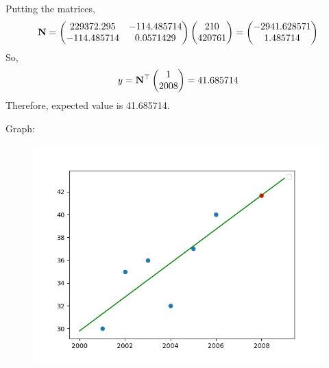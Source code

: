 \documentclass{beamer}
\numberwithin{equation}{section}
\begin{document}
		Putting the matrices,\begin{align}
				\mathbf{N}	= \begin{pmatrix}229372.295 & -114.485714 \\
-114.485714 & 0.0571429\end{pmatrix}\begin{pmatrix}210 \\ 420761\end{pmatrix} = \begin{pmatrix}-2941.628571 \\
1.485714\end{pmatrix}
		\end{align}
		So,
		\begin{align}
				y = \mathbf{N}^\top\begin{pmatrix}1\\2008\end{pmatrix} = 41.685714
		\end{align}
		Therefore, expected value is 41.685714.
	

	Graph:
\begin{figure}[h!]
	\centering
	\includegraphics[width=0.7\linewidth]{img.png}
\end{figure}
\end{document}
